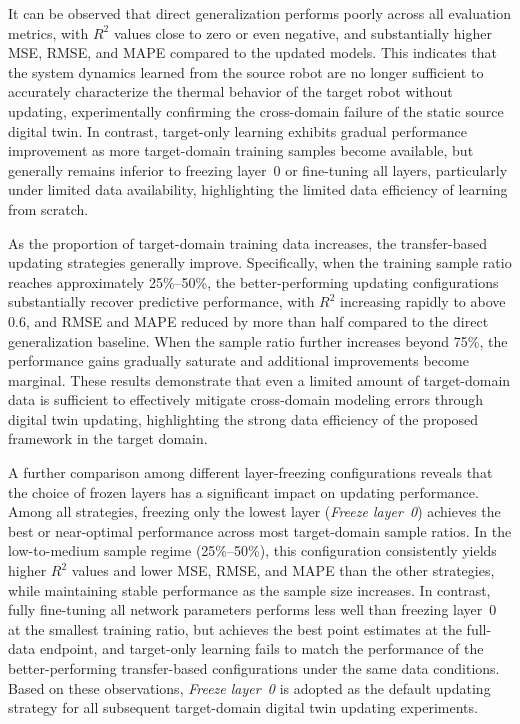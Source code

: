 \documentclass[a4paper,10pt]{cas-sc}%
\newcommand{\roundtworev}[1]{\textcolor{roundtwored}{#1}}
\begin{document}
It can be observed that direct generalization performs poorly across all evaluation metrics, with \(R^2\) values close to zero or even negative, and substantially higher MSE, RMSE, and MAPE compared to the updated models. This indicates that the system dynamics learned from the source robot are no longer sufficient to accurately characterize the thermal behavior of \roundtworev{the target robot without updating}, experimentally confirming \roundtworev{the cross-domain failure of the static source digital twin}. In contrast, target-only learning exhibits gradual performance improvement as more target-domain training samples become available, but \roundtworev{generally remains inferior to freezing layer~0 or fine-tuning all layers}, particularly under limited data availability, highlighting the limited data efficiency of learning from scratch.

As the proportion of target-domain training data increases, \roundtworev{the transfer-based updating strategies generally improve}. Specifically, when the training sample ratio reaches approximately 25\%--50\%, \roundtworev{the better-performing updating configurations substantially recover predictive performance}, with \(R^2\) increasing rapidly to above 0.6, and RMSE and MAPE reduced by more than half compared to the direct generalization baseline. When the sample ratio further increases beyond 75\%, the performance gains gradually saturate and additional improvements become marginal. These results demonstrate that even a limited amount of target-domain data is sufficient to effectively mitigate \roundtworev{cross-domain modeling errors} through digital twin updating, highlighting the strong data efficiency of the proposed framework in the target domain.

A further comparison among different layer-freezing configurations reveals that the choice of frozen layers has a significant impact on updating performance. Among all strategies, freezing only the lowest layer (\emph{Freeze layer~0}) achieves the best or near-optimal performance across \roundtworev{most} target-domain sample ratios. In the low-to-medium sample regime (\roundtworev{25\%--50\%}), this configuration consistently yields higher \(R^2\) values and lower MSE, RMSE, and MAPE than the other strategies, while maintaining stable performance as the sample size increases. In contrast, fully fine-tuning all network parameters \roundtworev{performs less well than freezing layer~0 at the smallest training ratio, but achieves the best point estimates at the full-data endpoint}, and target-only learning fails to match the performance of \roundtworev{the better-performing transfer-based configurations} under the same data conditions. Based on these observations, \emph{Freeze layer~0} is adopted as the default updating strategy for all subsequent target-domain digital twin updating experiments.
\end{document}
